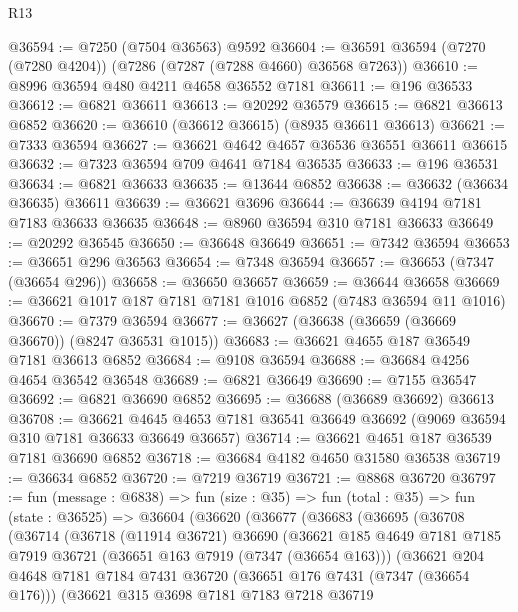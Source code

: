 \begin{lexlean}{R13}
\begin{coremodule}
@36594 := @7250 (@7504 @36563) @9592
@36604 := @36591 @36594 (@7270 (@7280 @4204)) (@7286 (@7287 (@7288 @4660) @36568 @7263))
@36610 := @8996 @36594 @480 @4211 @4658 @36552 @7181
@36611 := @196 @36533
@36612 := @6821 @36611
@36613 := @20292 @36579
@36615 := @6821 @36613 @6852
@36620 := @36610 (@36612 @36615) (@8935 @36611 @36613)
@36621 := @7333 @36594
@36627 := @36621 @4642 @4657 @36536 @36551 @36611 @36615
@36632 := @7323 @36594 @709 @4641 @7184 @36535
@36633 := @196 @36531
@36634 := @6821 @36633
@36635 := @13644 @6852
@36638 := @36632 (@36634 @36635) @36611
@36639 := @36621 @3696
@36644 := @36639 @4194 @7181 @7183 @36633 @36635
@36648 := @8960 @36594 @310 @7181 @36633
@36649 := @20292 @36545
@36650 := @36648 @36649
@36651 := @7342 @36594
@36653 := @36651 @296 @36563
@36654 := @7348 @36594
@36657 := @36653 (@7347 (@36654 @296))
@36658 := @36650 @36657
@36659 := @36644 @36658
@36669 := @36621 @1017 @187 @7181 @7181 @1016 @6852 (@7483 @36594 @11 @1016)
@36670 := @7379 @36594
@36677 := @36627 (@36638 (@36659 (@36669 @36670)) (@8247 @36531 @1015))
@36683 := @36621 @4655 @187 @36549 @7181 @36613 @6852
@36684 := @9108 @36594
@36688 := @36684 @4256 @4654 @36542 @36548
@36689 := @6821 @36649
@36690 := @7155 @36547
@36692 := @6821 @36690 @6852
@36695 := @36688 (@36689 @36692) @36613
@36708 := @36621
    @4645
    @4653
    @7181
    @36541
    @36649
    @36692
    (@9069 @36594 @310 @7181 @36633 @36649 @36657)
@36714 := @36621 @4651 @187 @36539 @7181 @36690 @6852
@36718 := @36684 @4182 @4650 @31580 @36538
@36719 := @36634 @6852
@36720 := @7219 @36719
@36721 := @8868 @36720
@36797 := fun (message : @6838) =>
  fun (size : @35) =>
  fun (total : @35) =>
  fun (state : @36525) =>
  @36604
    (@36620
      (@36677
        (@36683
          (@36695
            (@36708
              (@36714
                (@36718
                  (@11914 @36721)
                  @36690
                  (@36621
                    @185
                    @4649
                    @7181
                    @7185
                    @7919
                    @36721
                    (@36651 @163 @7919 (@7347 (@36654 @163)))
                    (@36621
                      @204
                      @4648
                      @7181
                      @7184
                      @7431
                      @36720
                      (@36651 @176 @7431 (@7347 (@36654 @176)))
                      (@36621
                        @315
                        @3698
                        @7181
                        @7183
                        @7218
                        @36719

\end{coremodule}
\end{lexlean}
